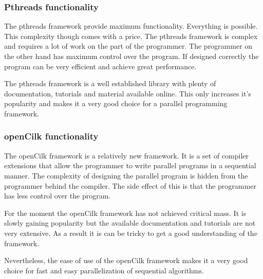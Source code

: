 \subsubsection*{Pthreads functionality}

The pthreads framework provide maximum functionality. Everything is possible.
This complexity though comes with a price. The pthreads framework is complex
and requires a lot of work on the part of the programmer. The programmer on the
other hand has maximum control over the program. If designed correctly the program
can be very efficient and achieve great performance.

The pthreads framework is a well established library with plenty of documentation,
tutorials and material available online. This only increases it's popularity and
makes it a very good choice for a parallel programming framework.

\subsubsection*{openCilk functionality}

The openCilk framework is a relatively new framework. It is a set of compiler extensions
that allow the programmer to write parallel programs in a sequential manner. The complexity
of designing the parallel program is hidden from the programmer behind the compiler. The side
effect of this is that the programmer has less control over the program.

For the moment the openCilk framework has not achieved critical mass. It is slowly gaining
popularity but the available documentation and tutorials are not very extensive. As a result
it is can be tricky to get a good understanding of the framework.

Nevertheless, the ease of use of the openCilk framework makes it a very good choice for fast
and easy parallelization of sequential algorithms.
